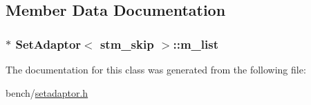 \subsection{Member Data Documentation}
\hypertarget{classSetAdaptor_3_01stm__skip_01_4_af6811b604dc2efe0527fd9fa824a3c3e}{
\subsubsection[{m\-\_\-list}]{$\ast$ {\bf Set\-Adaptor}$<$ {\bf stm\-\_\-skip} $>$\-::m\-\_\-list\hspace{0.3cm}{\ttfamily [private]}}}\label{classSetAdaptor_3_01stm__skip_01_4_af6811b604dc2efe0527fd9fa824a3c3e}


The documentation for this class was generated from the following file\-:\begin{DoxyCompactItemize}
\item 
bench/\hyperlink{setadaptor_8h}{setadaptor.\-h}\end{DoxyCompactItemize}
